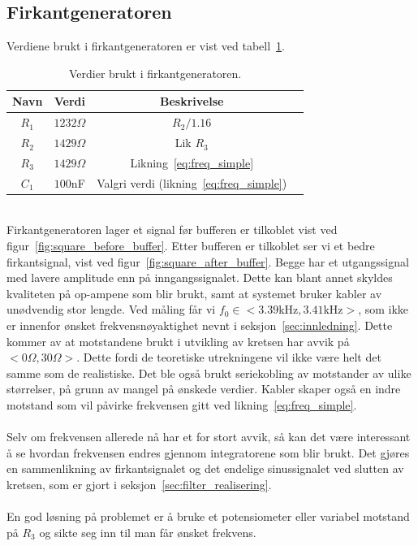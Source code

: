 \documentclass[a4paper,11pt,norsk]{article}
\begin{document}
\subsection{Firkantgeneratoren}
Verdiene brukt i firkantgeneratoren er vist ved tabell~\ref{table:variabler}.
\begin{table}[htbp]
\centering
\begin{tabular}{ |c|c|c|c| } 
\hline
\textbf{Navn} & \textbf{Verdi} & \textbf{Beskrivelse} \\
\hline
$R_1$ & $1232\Omega$ & $R_2 / 1.16$ \\ 
\hline
$R_2$ & $1429\Omega$ & Lik $R_3$ \\
\hline
$R_3$ & $1429\Omega$ & Likning~\ref{eq:freq_simple} \\
\hline
$C_1$ & $100$nF & Valgri verdi (likning~\ref{eq:freq_simple}) \\
\hline
\end{tabular}
\caption{Verdier brukt i firkantgeneratoren.}
\label{table:variabler}
\end{table}
\\
Firkantgeneratoren lager et signal før bufferen er tilkoblet vist ved figur~\ref{fig:square_before_buffer}.
Etter bufferen er tilkoblet ser vi et bedre firkantsignal, vist ved figur~\ref{fig:square_after_buffer}.
Begge har et utgangssignal med lavere amplitude enn på inngangssignalet. Dette kan blant annet skyldes kvaliteten på op-ampene som blir brukt, samt at systemet bruker kabler av unødvendig stor lengde. Ved måling får vi $f_0 \in <3.39$kHz$, 3.41$kHz$>$, som ikke er innenfor ønsket frekvensnøyaktighet nevnt i seksjon~\ref{sec:innledning}. Dette kommer av at motstandene brukt i utvikling av kretsen har avvik på$ <0\Omega, 30\Omega>$. Dette fordi de teoretiske utrekningene vil ikke være helt det samme som de realistiske. Det ble også brukt seriekobling av motstander av ulike størrelser, på grunn av mangel på ønskede verdier. Kabler skaper også en indre motstand som vil påvirke frekvensen gitt ved likning~\ref{eq:freq_simple}. \\\\
Selv om frekvensen allerede nå har et for stort avvik, så kan det være interessant å se hvordan frekvensen endres gjennom integratorene som blir brukt. Det gjøres en sammenlikning av firkantsignalet og det endelige sinussignalet ved slutten av kretsen, som er gjort i seksjon~\ref{sec:filter_realisering}.
\\\\
En god løsning på problemet er å bruke et potensiometer eller variabel motstand på $R_3$ og sikte seg inn til man får ønsket frekvens.
\end{document}
